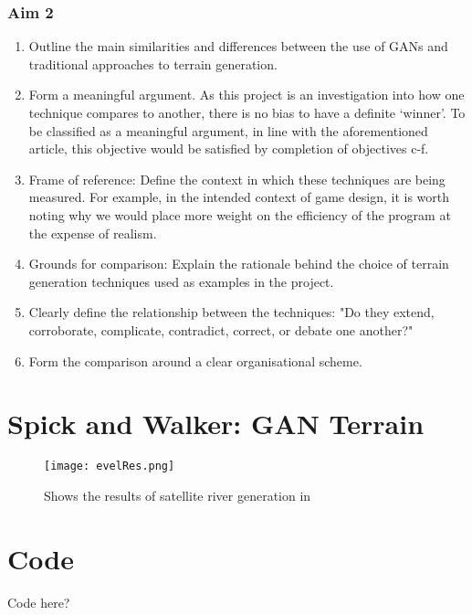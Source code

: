\documentclass[a4paper]{report}
\begin{document}
\begin{appendices}
\subsubsection{Aim 2}
\begin{enumerate}
    \renewcommand{\theenumi}{\alph{enumi}}
    \item Outline the main similarities and differences between the use of GANs and traditional approaches to terrain generation.
    \item Form a meaningful argument. As this project is an investigation into how one technique compares to another, there is no bias to have a definite `winner'. To be classified as a meaningful argument, in line with the aforementioned article, this objective would be satisfied by completion of objectives c-f.
    \item Frame of reference: Define the context in which these techniques are being measured. For example, in the intended context of game design, it is worth noting why we would place more weight on the efficiency of the program at the expense of realism.
    \item Grounds for comparison: Explain the rationale behind the choice of terrain generation techniques used as examples in the project.
    \item Clearly define the relationship between the techniques: "Do they extend, corroborate, complicate, contradict, correct, or debate one another?" \cite{ToDo}
    \item Form the comparison around a clear organisational scheme.
    \end{enumerate}
\section{Spick and Walker: GAN Terrain}
\label{appendix:gan}
    \begin{figure}[H]
        \centering
            \texttt{[image: evelRes.png]}
            \caption{Shows the results of satellite river generation in \cite{riverSat}}
            \label{fig:elevRes}
    \end{figure}
\section{Code}
Code here?
\end{appendices}
\end{document}
